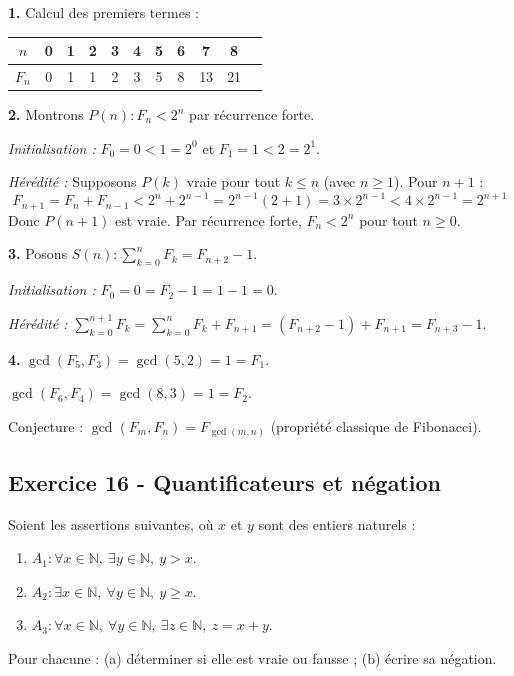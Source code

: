 \documentclass[12pt,a4paper]{article}
\begin{document}
\begin{boitecorrige}
\textbf{1.} Calcul des premiers termes :

\begin{center}
\begin{tabular}{c|cccccccccc}
$n$ & 0 & 1 & 2 & 3 & 4 & 5 & 6 & 7 & 8 \\
\hline
$F_n$ & 0 & 1 & 1 & 2 & 3 & 5 & 8 & 13 & 21
\end{tabular}
\end{center}

\textbf{2.} Montrons $P(n) : F_n < 2^n$ par récurrence forte.

\textit{Initialisation :} $F_0 = 0 < 1 = 2^0$ et $F_1 = 1 < 2 = 2^1$.

\textit{Hérédité :} Supposons $P(k)$ vraie pour tout $k \leq n$ (avec $n \geq 1$). Pour $n+1$ :
\[
F_{n+1} = F_n + F_{n-1} < 2^n + 2^{n-1} = 2^{n-1}(2+1) = 3\times2^{n-1} < 4\times2^{n-1} = 2^{n+1}
\]
Donc $P(n+1)$ est vraie. Par récurrence forte, $F_n < 2^n$ pour tout $n\geq0$.

\textbf{3.} Posons $S(n) : \sum_{k=0}^{n} F_k = F_{n+2} - 1$.

\textit{Initialisation :} $F_0 = 0 = F_2 - 1 = 1 - 1 = 0$.

\textit{Hérédité :} $\sum_{k=0}^{n+1} F_k = \sum_{k=0}^{n} F_k + F_{n+1} = (F_{n+2}-1) + F_{n+1} = F_{n+3} - 1$.

\textbf{4.} $\gcd(F_5, F_3) = \gcd(5, 2) = 1 = F_1$.

$\gcd(F_6, F_4) = \gcd(8, 3) = 1 = F_2$.

Conjecture : $\gcd(F_m, F_n) = F_{\gcd(m,n)}$ (propriété classique de Fibonacci).
\end{boitecorrige}

\subsection*{Exercice 16 - Quantificateurs et négation \niveau{\facile}}

\begin{boiteexercice}
Soient les assertions suivantes, où $x$ et $y$ sont des entiers naturels :
\begin{enumerate}
  \item $A_1 : \forall x\in\mathbb{N},\ \exists y\in\mathbb{N},\ y > x$.
  \item $A_2 : \exists x\in\mathbb{N},\ \forall y\in\mathbb{N},\ y \geq x$.
  \item $A_3 : \forall x\in\mathbb{N},\ \forall y\in\mathbb{N},\ \exists z\in\mathbb{N},\ z = x+y$.
\end{enumerate}
Pour chacune : (a) déterminer si elle est vraie ou fausse ; (b) écrire sa négation.
\end{boiteexercice}
\end{document}
